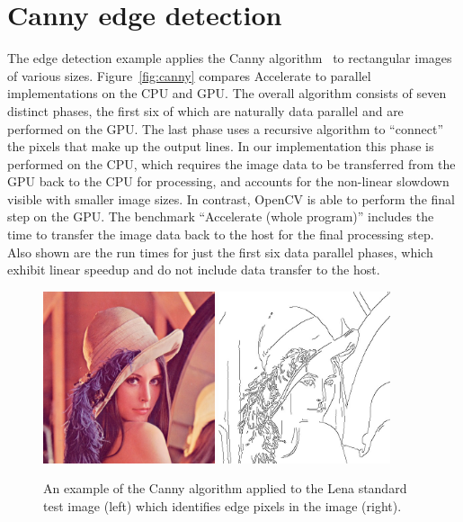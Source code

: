 \section{Canny edge detection}
\label{sec:canny}

The edge detection example applies the Canny algorithm~\cite{Canny:1986et} to
rectangular images of various sizes. Figure~\ref{fig:canny} compares Accelerate
to parallel implementations on the CPU and GPU\@. The overall algorithm consists
of seven distinct phases, the first six of which are naturally data parallel and
are performed on the GPU\@. The last phase uses a recursive algorithm to
``connect'' the pixels that make up the output lines. In our implementation this
phase is performed on the CPU, which requires the image data to be transferred
from the GPU back to the CPU for processing, and accounts for the non-linear
slowdown visible with smaller image sizes. In contrast, OpenCV is able to
perform the final step on the GPU\@. The benchmark ``Accelerate (whole
program)'' includes the time to transfer the image data back to the host for the
final processing step. Also shown are the run times for just the first six data
parallel phases, which exhibit linear speedup and do not include data transfer
to the host.

\begin{figure}
    \begin{center}
        \includegraphics[width=0.45\textwidth]{images/sec-6/canny/lena}
        \includegraphics[width=0.45\textwidth]{images/sec-6/canny/lena-edges}
    \end{center}
    \caption[Example of the Canny edge detection algorithm]{An example of the
        Canny algorithm applied to the Lena standard test image (left) which
        identifies edge pixels in the image (right).}
    \label{fig:lena}
\end{figure}

